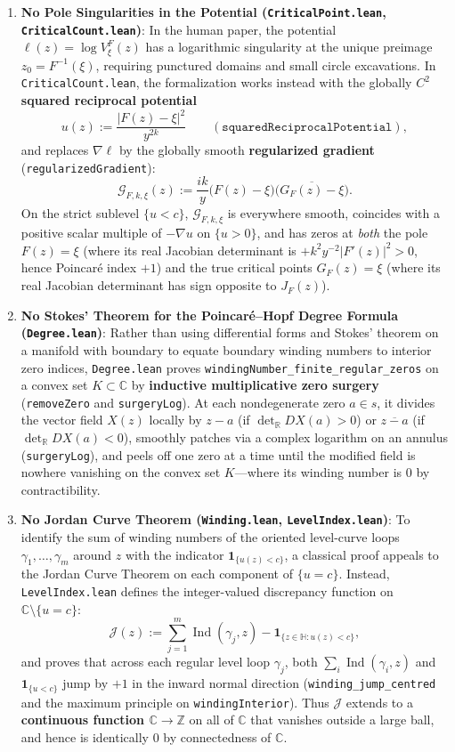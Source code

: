 \documentclass[11pt,reqno]{amsart}
\theoremstyle{definition}
\newcommand{\C}{\mathbb{C}}
\newcommand{\R}{\mathbb{R}}
\newcommand{\Z}{\mathbb{Z}}
\newcommand{\uhp}{\mathbb{H}}
\newcommand{\detR}{\det_{\R}}
\newcommand{\ind}{\operatorname{Ind}}
\begin{document}
\begin{enumerate}[label=\textbf{Bypass \arabic*.},leftmargin=*]
\item \textbf{No Pole Singularities in the Potential (\texttt{CriticalPoint.lean}, \texttt{CriticalCount.lean})}:
In the human paper, the potential $\ell(z) = \log V_\xi^F(z)$ has a logarithmic singularity at the unique preimage $z_0 = F^{-1}(\xi)$, requiring punctured domains and small circle excavations. In \texttt{CriticalCount.lean}, the formalization works instead with the globally $C^2$ \textbf{squared reciprocal potential}
\[
u(z) := \frac{|F(z)-\xi|^2}{y^{2k}} \qquad (\texttt{squaredReciprocalPotential}),
\]
and replaces $\nabla \ell$ by the globally smooth \textbf{regularized gradient} (\texttt{regularizedGradient}):
\[
\mathcal{G}_{F,k,\xi}(z) := \frac{ik}{y}\bigl(F(z)-\xi\bigr)\overline{\bigl(G_F(z)-\xi\bigr)}.
\]
On the strict sublevel $\{u < c\}$, $\mathcal{G}_{F,k,\xi}$ is everywhere smooth, coincides with a positive scalar multiple of $-\nabla u$ on $\{u > 0\}$, and has zeros at \emph{both} the pole $F(z)=\xi$ (where its real Jacobian determinant is $+k^2 y^{-2}|F'(z)|^2 > 0$, hence Poincaré index $+1$) and the true critical points $G_F(z)=\xi$ (where its real Jacobian determinant has sign opposite to $J_F(z)$).

\item \textbf{No Stokes' Theorem for the Poincaré--Hopf Degree Formula (\texttt{Degree.lean})}:
Rather than using differential forms and Stokes' theorem on a manifold with boundary to equate boundary winding numbers to interior zero indices, \texttt{Degree.lean} proves \texttt{windingNumber\_finite\_regular\_zeros} on a convex set $K \subset \C$ by \textbf{inductive multiplicative zero surgery} (\texttt{removeZero} and \texttt{surgeryLog}). At each nondegenerate zero $a \in s$, it divides the vector field $X(z)$ locally by $z-a$ (if $\detR DX(a) > 0$) or $\overline{z-a}$ (if $\detR DX(a) < 0$), smoothly patches via a complex logarithm on an annulus (\texttt{surgeryLog}), and peels off one zero at a time until the modified field is nowhere vanishing on the convex set $K$---where its winding number is $0$ by contractibility.

\item \textbf{No Jordan Curve Theorem (\texttt{Winding.lean}, \texttt{LevelIndex.lean})}:
To identify the sum of winding numbers of the oriented level-curve loops $\gamma_1,\dots,\gamma_m$ around $z$ with the indicator $\mathbf{1}_{\{u(z) < c\}}$, a classical proof appeals to the Jordan Curve Theorem on each component of $\{u = c\}$. Instead, \texttt{LevelIndex.lean} defines the integer-valued discrepancy function on $\C \setminus \{u=c\}$:
\[
\mathcal{J}(z) := \sum_{j=1}^m \ind(\gamma_j, z) - \mathbf{1}_{\{z \in \uhp : u(z) < c\}},
\]
and proves that across each regular level loop $\gamma_j$, both $\sum_i \ind(\gamma_i, z)$ and $\mathbf{1}_{\{u < c\}}$ jump by $+1$ in the inward normal direction (\texttt{winding\_jump\_centred} and the maximum principle on \texttt{windingInterior}). Thus $\mathcal{J}$ extends to a \textbf{continuous function $\C \to \Z$} on all of $\C$ that vanishes outside a large ball, and hence is identically $0$ by connectedness of $\C$.


\end{enumerate}
\end{document}
